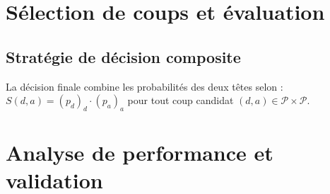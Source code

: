 \documentclass[12pt,a4paper]{report}
\numberwithin{equation}{section}
\begin{document}

\chapter{Sélection de coups et évaluation}

\section{Stratégie de décision composite}

\begin{definition}
La décision finale combine les probabilités des deux têtes selon :
$S(d,a) = (p_d)_d \cdot (p_a)_a$
pour tout coup candidat $(d,a) \in \mathcal{P} \times \mathcal{P}$.
\end{definition}





\chapter{Analyse de performance et validation}
\end{document}
